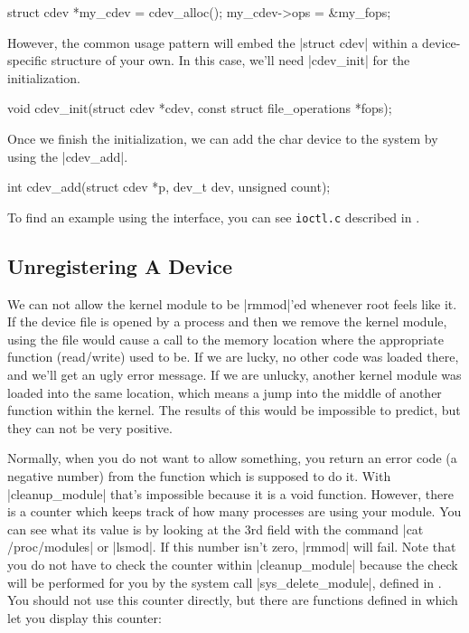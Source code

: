 \documentclass[10pt, oneside]{book}
\begin{document}
\begin{code}
struct cdev *my_cdev = cdev_alloc();
my_cdev->ops = &my_fops;
\end{code}

However, the common usage pattern will embed the \cpp|struct cdev| within a device-specific structure of your own.
In this case, we'll need \cpp|cdev_init| for the initialization.

\begin{code}
void cdev_init(struct cdev *cdev, const struct file_operations *fops);
\end{code}

Once we finish the initialization, we can add the char device to the system by using the \cpp|cdev_add|.

\begin{code}
int cdev_add(struct cdev *p, dev_t dev, unsigned count);
\end{code}

To find an example using the interface, you can see \verb|ioctl.c| described in .

\subsection{Unregistering A Device}
\label{sec:unregister_device}
We can not allow the kernel module to be \sh|rmmod|'ed whenever root feels like it.
If the device file is opened by a process and then we remove the kernel module, using the file would cause a call to the memory location where the appropriate function (read/write) used to be.
If we are lucky, no other code was loaded there, and we'll get an ugly error message.
If we are unlucky, another kernel module was loaded into the same location, which means a jump into the middle of another function within the kernel.
The results of this would be impossible to predict, but they can not be very positive.

Normally, when you do not want to allow something, you return an error code (a negative number) from the function which is supposed to do it.
With \cpp|cleanup_module| that's impossible because it is a void function.
However, there is a counter which keeps track of how many processes are using your module.
You can see what its value is by looking at the 3rd field with the command \sh|cat /proc/modules| or \sh|lsmod|.
If this number isn't zero, \sh|rmmod| will fail.
Note that you do not have to check the counter within \cpp|cleanup_module| because the check will be performed for you by the system call \cpp|sys_delete_module|, defined in .
You should not use this counter directly, but there are functions defined in  which let you display this counter:
\end{document}
